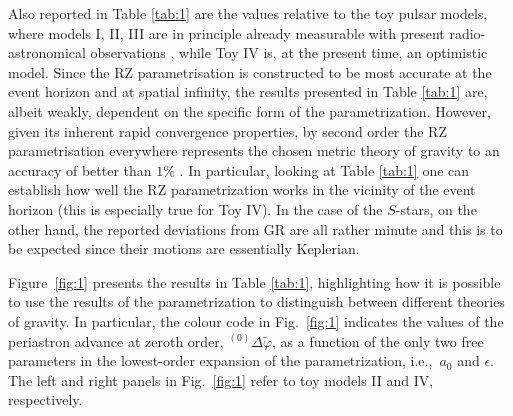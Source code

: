\documentclass[a4paper,aps,twocolumn,showpacs,showkeys,nofootinbib,preprintnumbers,superscriptaddress,amsmath,amssymb,amsfonts]{revtex4-1}
\newcommand{\ie}{{i.e.,}~}
\begin{document}
Also reported in Table \ref{tab:1} are the values relative to the toy
pulsar models, where models I, II, III are in principle already measurable
with present radio-astronomical observations \citep[see][]{Liu2012},
while Toy IV is, at the present time, an optimistic model.
Since the RZ parametrisation is constructed to be most accurate at the
event horizon and at spatial infinity, the results presented in Table \ref{tab:1}
are, albeit weakly, dependent on the specific form of the parametrization.
However, given its inherent rapid convergence properties, by second order
the RZ parametrisation everywhere represents the chosen metric theory of gravity
to an accuracy of better than $1\%$ \cite{Rezzolla2014}.
In particular, looking at Table \ref{tab:1} one can
establish how well the RZ parametrization works in the vicinity of the
event horizon (this is especially true for Toy IV). In the case
of the $S$-stars, on the other hand, the reported deviations from GR are
all rather minute and this is to be expected since their motions are
essentially Keplerian.

Figure~\ref{fig:1} presents the results in Table \ref{tab:1},
highlighting how it is possible to use the results of the parametrization
to distinguish between different theories of gravity. 
In particular, the colour code in Fig.~\ref{fig:1} indicates the values of the
periastron advance at zeroth order, ${}^{(0)}\Delta\widetilde{\varphi}$, as a function of the
only two free parameters in the lowest-order expansion of the
parametrization, \ie $a_0$ and $\epsilon$. 
The left and right panels in Fig.~\ref{fig:1} refer to toy models II and IV, respectively.
\end{document}
